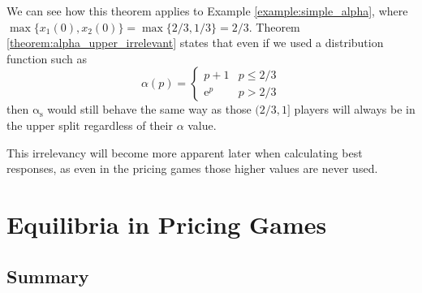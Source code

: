 \documentclass[10pt,a4paper]{book}
\newcommand{\as}{\mathrm{\alpha_s}}
\theoremstyle{definition}
\theoremstyle{comment}
\begin{document}
We can see how this theorem applies to Example \ref{example:simple_alpha}, where $\max\{x_1(0), x_2(0)\} = \max\{2/3, 1/3\} = 2/3$.
Theorem \ref{theorem:alpha_upper_irrelevant} states that even if we used a distribution function such as
\[
	\alpha(p) =
	\begin{cases}
		p + 1 & p \le 2/3 \\
		\mathrm{e}^p & p > 2/3
	\end{cases}
\]
then $\as$ would still behave the same way as those $(2/3, 1]$ players will always be in the upper split regardless of their $\alpha$ value.

This irrelevancy will become more apparent later when calculating best responses, as even in the pricing games those higher values are never used.

\cleardoublepage


\chapter{Equilibria in Pricing Games}
\label{chapter:pricing_equilibria}

\section*{Summary}
\end{document}
